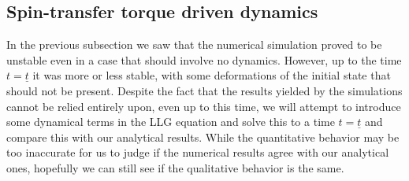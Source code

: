 \subsection{Spin-transfer torque driven dynamics}
In the previous subsection we saw that the numerical simulation proved to be unstable even in a case that should involve no dynamics. However, up to the time $t=\underline{t}$ it was more or less stable, with some deformations of the initial state that should not be present. Despite the fact that the results yielded by the simulations cannot be relied entirely upon, even up to this time, we will attempt to introduce some dynamical terms in the LLG equation and solve this to a time $t=\underline{t}$ and compare this with our analytical results. While the quantitative behavior may be too inaccurate for us to judge if the numerical results agree with our analytical ones, hopefully we can still see if the qualitative behavior is the same. 
